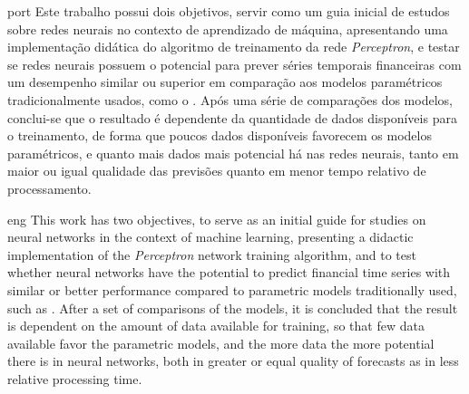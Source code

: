 


\begin{resumo}{port}
Este trabalho possui dois objetivos, servir como um guia inicial de estudos sobre redes neurais no contexto de aprendizado de máquina, apresentando uma implementação didática do algoritmo de treinamento da rede \emph{Perceptron}, e testar se redes neurais possuem o potencial para prever séries temporais financeiras com um desempenho similar ou superior em comparação aos modelos paramétricos tradicionalmente usados, como o . Após uma série de comparações dos modelos, conclui-se que o resultado é dependente da quantidade de dados disponíveis para o treinamento, de forma que poucos dados disponíveis favorecem os modelos paramétricos, e quanto mais dados mais potencial há nas redes neurais, tanto em maior ou igual qualidade das previsões quanto em menor tempo relativo de processamento.
\end{resumo}



\begin{resumo}{eng}
This work has two objectives, to serve as an initial guide for studies on neural networks in the context of machine learning, presenting a didactic implementation of the \emph{Perceptron} network training algorithm, and to test whether neural networks have the potential to predict financial time series with similar or better performance compared to parametric models traditionally used, such as . After a set of comparisons of the models, it is concluded that the result is dependent on the amount of data available for training, so that few data available favor the parametric models, and the more data the more potential there is in neural networks, both in greater or equal quality of forecasts as in less relative processing time.
\end{resumo}
